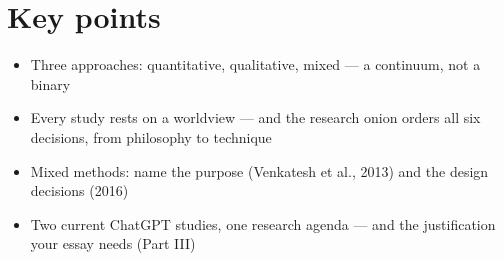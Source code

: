 \documentclass[11pt,a4paper,british,twoside=false,headings=small,chapterprefix=false,numbers=noenddot]{scrbook}
\begin{document}
\section*{Key points}
\begin{itemize}
  \item Three approaches: quantitative, qualitative, mixed --- a continuum, not a binary
  \item Every study rests on a worldview --- and the research onion orders all six decisions, from philosophy to technique
  \item Mixed methods: name the purpose (Venkatesh et al., 2013) and the design decisions (2016)
  \item Two current ChatGPT studies, one research agenda --- and the justification your essay needs (Part III)
\end{itemize}
\end{document}
